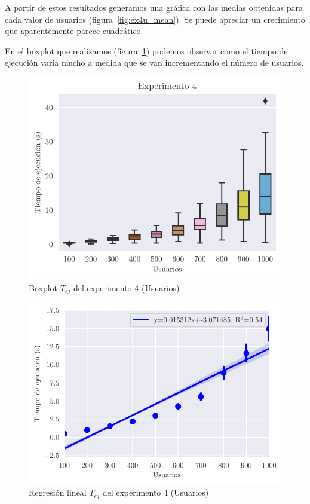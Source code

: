 A partir de estos resultados generamos una gráfica con las medias obtenidas para cada valor de usuarios (figura~\ref{fig:ex4u_mean}). Se puede apreciar un crecimiento que aparentemente parece cuadrático.

En el boxplot que realizamos (figura~\ref{fig:ex4u}) podemos observar como el tiempo de ejecución
varia mucho a medida que se van incrementando el número de usuarios.

\begin{figure}[H]
    \centering
    \includegraphics{include/plots/ex4_u_time_bplot.pdf}
    \caption{Boxplot $T_{ej}$ del experimento 4 (Usuarios)}%
    \label{fig:ex4u}
\end{figure}

\begin{figure}[H]
    \centering
    \includegraphics{include/plots/ex4u_time_reg.pdf}
    \caption{Regresión lineal $T_{ej}$ del experimento 4 (Usuarios)}%
    \label{fig:ex4u_reg}
\end{figure}

